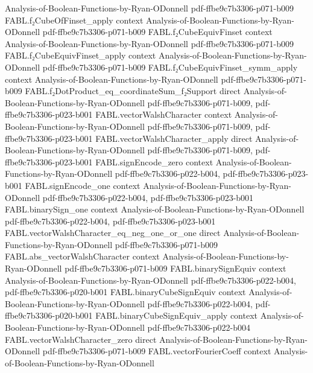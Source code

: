 \begin{theorem}
  {Analysis-of-Boolean-Functions-by-Ryan-ODonnell}
  {pdf-ffbe9c7b3306-p071-b009}
\proofstep
  {FABL.f₂CubeOfFinset_apply}
  {context}
  {Analysis-of-Boolean-Functions-by-Ryan-ODonnell}
  {pdf-ffbe9c7b3306-p071-b009}
\proofstep
  {FABL.f₂CubeEquivFinset}
  {context}
  {Analysis-of-Boolean-Functions-by-Ryan-ODonnell}
  {pdf-ffbe9c7b3306-p071-b009}
\proofstep
  {FABL.f₂CubeEquivFinset_apply}
  {context}
  {Analysis-of-Boolean-Functions-by-Ryan-ODonnell}
  {pdf-ffbe9c7b3306-p071-b009}
\proofstep
  {FABL.f₂CubeEquivFinset_symm_apply}
  {context}
  {Analysis-of-Boolean-Functions-by-Ryan-ODonnell}
  {pdf-ffbe9c7b3306-p071-b009}
\proofstep
  {FABL.f₂DotProduct_eq_coordinateSum_f₂Support}
  {direct}
  {Analysis-of-Boolean-Functions-by-Ryan-ODonnell}
  {pdf-ffbe9c7b3306-p071-b009,
    pdf-ffbe9c7b3306-p023-b001}
\proofstep
  {FABL.vectorWalshCharacter}
  {context}
  {Analysis-of-Boolean-Functions-by-Ryan-ODonnell}
  {pdf-ffbe9c7b3306-p071-b009,
    pdf-ffbe9c7b3306-p023-b001}
\proofstep
  {FABL.vectorWalshCharacter_apply}
  {direct}
  {Analysis-of-Boolean-Functions-by-Ryan-ODonnell}
  {pdf-ffbe9c7b3306-p071-b009,
    pdf-ffbe9c7b3306-p023-b001}
\proofstep
  {FABL.signEncode_zero}
  {context}
  {Analysis-of-Boolean-Functions-by-Ryan-ODonnell}
  {pdf-ffbe9c7b3306-p022-b004,
    pdf-ffbe9c7b3306-p023-b001}
\proofstep
  {FABL.signEncode_one}
  {context}
  {Analysis-of-Boolean-Functions-by-Ryan-ODonnell}
  {pdf-ffbe9c7b3306-p022-b004,
    pdf-ffbe9c7b3306-p023-b001}
\proofstep
  {FABL.binarySign_one}
  {context}
  {Analysis-of-Boolean-Functions-by-Ryan-ODonnell}
  {pdf-ffbe9c7b3306-p022-b004,
    pdf-ffbe9c7b3306-p023-b001}
\proofstep
  {FABL.vectorWalshCharacter_eq_neg_one_or_one}
  {direct}
  {Analysis-of-Boolean-Functions-by-Ryan-ODonnell}
  {pdf-ffbe9c7b3306-p071-b009}
\proofstep
  {FABL.abs_vectorWalshCharacter}
  {context}
  {Analysis-of-Boolean-Functions-by-Ryan-ODonnell}
  {pdf-ffbe9c7b3306-p071-b009}
\proofstep
  {FABL.binarySignEquiv}
  {context}
  {Analysis-of-Boolean-Functions-by-Ryan-ODonnell}
  {pdf-ffbe9c7b3306-p022-b004,
    pdf-ffbe9c7b3306-p020-b001}
\proofstep
  {FABL.binaryCubeSignEquiv}
  {context}
  {Analysis-of-Boolean-Functions-by-Ryan-ODonnell}
  {pdf-ffbe9c7b3306-p022-b004,
    pdf-ffbe9c7b3306-p020-b001}
\proofstep
  {FABL.binaryCubeSignEquiv_apply}
  {context}
  {Analysis-of-Boolean-Functions-by-Ryan-ODonnell}
  {pdf-ffbe9c7b3306-p022-b004}
\proofstep
  {FABL.vectorWalshCharacter_zero}
  {direct}
  {Analysis-of-Boolean-Functions-by-Ryan-ODonnell}
  {pdf-ffbe9c7b3306-p071-b009}
\proofstep
  {FABL.vectorFourierCoeff}
  {context}
  {Analysis-of-Boolean-Functions-by-Ryan-ODonnell}

\end{theorem}
